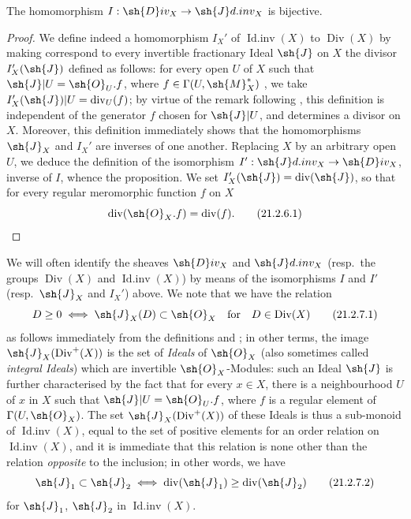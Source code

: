 \begin{proposition}[21.2.6]
\label{IV.21.2.6}
The homomorphism $I:\sh{D}iv_X\to\sh{J}d.inv_X$ is bijective.
\end{proposition}

\begin{proof}
We define indeed a homomorphism $I_X'$ of $\operatorname{Id.inv}(X)$ to $\operatorname{Div}(X)$ by making correspond to every invertible fractionary Ideal $\sh{J}$ on $X$ the divisor $I_X'(\sh{J})$ defined as follows:
for every open $U$ of $X$ such that $\sh{J}|U=\sh{O}_U.f$, where $f\in\Gamma(U,\sh{M}_X^*)$ , we take $I_X'(\sh{J})|U=\operatorname{div}_U(f)$;
by virtue of the remark following , this definition is independent of the generator $f$ chosen for $\sh{J}|U$, and determines a divisor on $X$.
Moreover, this definition immediately shows that the homomorphisms $\sh{J}_X$ and $I_X'$ are inverses of one another.
Replacing $X$ by an arbitrary open $U$, we deduce the definition of the isomorphism $I':\sh{J}d.inv_X\to\sh{D}iv_X$, inverse of $I$, whence the proposition.
We set $I_X'(\sh{J})=\operatorname{div}(\sh{J})$, so that for every regular meromorphic function $f$ on $X$
\[
\label{IV.21.2.6.1}
  \operatorname{div}(\sh{O}_X.f)=\operatorname{div}(f).
  \tag{21.2.6.1}
\]
\end{proof}

\begin{env}[21.2.7]
\label{IV.21.2.7}
We will often identify the sheaves $\sh{D}iv_X$ and $\sh{J}d.inv_X$ (resp.\ the groups $\operatorname{Div}(X)$ and $\operatorname{Id.inv}(X)$) by means of the isomorphisms $I$ and $I'$ (resp.\ $\sh{J}_X$ and $I_X'$) above.
We note that we have the relation
\[
\label{IV.21.2.7.1}
  D\geq 0 \iff \sh{J}_X(D)\subset\sh{O}_X \quad\text{for}\quad D\in\operatorname{Div}(X)
  \tag{21.2.7.1}
\]
as follows immediately from the definitions  and ;
in other terms, the image $\sh{J}_X(\operatorname{Div}^+(X))$ is the set of \emph{Ideals} of $\sh{O}_X$ (also sometimes called \emph{integral Ideals}) which are invertible $\sh{O}_X$-Modules:
such an Ideal $\sh{J}$ is further characterised by the fact that for every $x\in X$, there is a neighbourhood $U$ of $x$ in $X$ such that $\sh{J}|U=\sh{O}_U.f$, where $f$ is a regular element of $\Gamma(U,\sh{O}_X)$.
The set $\sh{J}_X(\operatorname{Div}^+(X))$ of these Ideals is thus a sub-monoid of $\operatorname{Id.inv}(X)$, equal to the set of positive elements for an order relation on $\operatorname{Id.inv}(X)$, and it is immediate that this relation is none other than the relation \emph{opposite} to the inclusion;
in other words, we have
\[
\label{IV.21.2.7.2}
  \sh{J}_1\subset\sh{J}_2 \iff \operatorname{div}(\sh{J}_1)\geq\operatorname{div}(\sh{J}_2)
  \tag{21.2.7.2}
\]
for $\sh{J}_1$, $\sh{J}_2$ in $\operatorname{Id.inv}(X)$.
\end{env}

